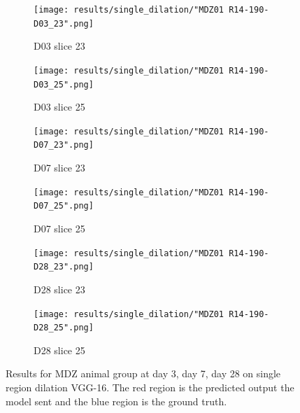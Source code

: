 \begin{figure}[!htb]  
    \centering %
\begin{subfigure}{0.35\textwidth}
  \texttt{[image: results/single\_dilation/"MDZ01 R14-190-D03\_23".png]}
  \caption{D03 slice 23}
\end{subfigure}\hfil %
\begin{subfigure}{0.35\textwidth}
  \texttt{[image: results/single\_dilation/"MDZ01 R14-190-D03\_25".png]}
  \caption{D03 slice 25}
\end{subfigure}

\medskip
\begin{subfigure}{0.35\textwidth}
  \texttt{[image: results/single\_dilation/"MDZ01 R14-190-D07\_23".png]}
  \caption{D07 slice 23}
\end{subfigure}\hfil %
\begin{subfigure}{0.35\textwidth}
  \texttt{[image: results/single\_dilation/"MDZ01 R14-190-D07\_25".png]}
  \caption{D07 slice 25}
\end{subfigure}

\medskip
\begin{subfigure}{0.35\textwidth}
  \texttt{[image: results/single\_dilation/"MDZ01 R14-190-D28\_23".png]}
  \caption{D28 slice 23}
\end{subfigure}\hfil %
\begin{subfigure}{0.35\textwidth}
  \texttt{[image: results/single\_dilation/"MDZ01 R14-190-D28\_25".png]}
  \caption{D28 slice 25}
\end{subfigure}
  
  \caption{Results for MDZ animal group at day 3, day 7, day 28 on single region dilation VGG-16. The red region is the predicted output the model sent and the blue region is the ground truth. }
  \label{fig:results_single_dilation_MDZ}
\end{figure}


